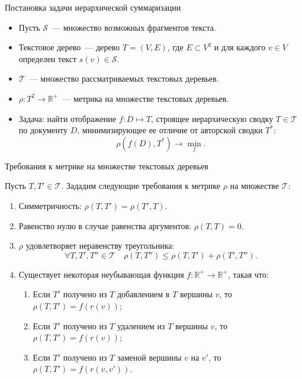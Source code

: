 \documentclass{beamer}
\newcommand{\R}{\mathbb{R}}
\begin{document}

\begin{frame}{Постановка задачи иерархической суммаризации}

\begin{itemize}
    \item Пусть $\mathcal{S}$~--- множество возможных фрагментов текста. \item Текстовое дерево~--- дерево $T = (V, E)$, где $E \subset V^2$ и для каждого $v\in V$ определен текст $s(v)\in\mathcal{S}$. 
    \item $\mathcal{T}$~--- множество рассматриваемых текстовых деревьев.
    \item $\rho: T^2\rightarrow\R^+$~--- метрика на множестве текстовых деревьев.
    \item Задача: найти отображение $f: D\mapsto T$, строящее иерархическую сводку $T\in\mathcal{T}$ по документу $D$, минимизирующее ее отличие от авторской сводки $T^*$:
    $$
    \rho(f(D), T^*)\longrightarrow\min_f.
    $$
\end{itemize}

\end{frame}


\begin{frame}{Требования к метрике на множестве текстовых деревьев}

Пусть $T, T' \in\mathcal{T}$. Зададим следующие требования к метрике $\rho$ на множестве $\mathcal{T}$:
\begin{enumerate}
    \item Симметричность: $\rho(T, T') = \rho(T', T)$.
    \item Равенство нулю в случае равенства аргументов: $\rho(T, T) = 0$.  
    \item $\rho$ удовлетворяет неравенству треугольника: 
    \begin{equation} \label{metric_requirement_6}
        \forall T, T', T''\in\mathcal{T}\quad \rho(T,T'')\leq\rho(T,T')+\rho(T',T'').
    \end{equation}
    \item Существует некоторая неубывающая функция $f: \R^+ \rightarrow \R^+$, такая что:
    \begin{enumerate}
        \item Если $T'$ получено из $T$ добавлением в $T$ вершины $v$, то $\rho(T, T') = f(r(v))$;
        \item Если $T'$ получено из $T$ удалением из $T$ вершины $v$, то $\rho(T, T') = f(r(v))$;
        \item Если $T'$ получено из $T$ заменой вершины $v$ на $v'$, то $\rho(T, T')= f(r(v, v'))$.
    \end{enumerate}
\end{enumerate}

\end{frame}
\end{document}
